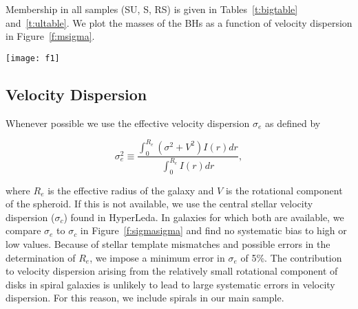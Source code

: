 \documentclass[twosided,letterpaper,numberedappendix]{emulateapj}
\newcommand{\beq}{
\begin{equation}
}
\newcommand{\eeq}{
\end{equation}
}
\newcommand{\msun}     {\ensuremath{{\rm M}_{\scriptscriptstyle \odot}}}
\newcommand{\kms}      {\ensuremath{~\mathrm{km~s^{-1}}}}
\newcommand{\msigma}   {\ensuremath{M}{--}\ensuremath{\sigma}}
\newcommand{\sigmaconf}   {\ensuremath{\sigma_{68}}}
\newcommand{\msint} {\ensuremath{8.12}}
\newcommand{\msslope} {\ensuremath{4.24}}
\begin{document}
Membership in all samples (SU, S, RS) is given in
Tables~\ref{t:bigtable} and~\ref{t:ultable}.  We plot the masses of
the BHs as a function of velocity dispersion in
Figure~\ref{f:msigma}.

\begin{figure*}[h]
\centering
\texttt{[image: f1]}
\caption{\footnotesize The \msigma\ relation for galaxies with
dynamical measurements.  The symbol indicates the method of BH mass
measurement: stellar dynamical (\emph{pentagrams}), gas dynamical
(\emph{circles)}, masers (\emph{asterisks}).  Arrows indicate
3$\sigmaconf$ upper limits to BH mass.  If the 3$\sigmaconf$ limit is
not available, we plot it at 3 times the 1$\sigmaconf$ or at 1.5 times
the 2$\sigmaconf$ limits.  For clarity, we only plot error boxes for
upper limits that are close to or below the best-fit relation.  The
color of the error ellipse indicates the Hubble type of the host
galaxy: elliptical (\emph{red}), S0 (\emph{green}), and spiral
(\emph{blue}).  The saturation of the colors in the error ellipses or
boxes is inversely proportional to the area of the ellipse or box.
Squares are galaxies that we do not include in our fit.  The line is
the best fit relation to the full sample:
$M_{\mathrm{BH}} = 10^{\msint}~\msun(\sigma/200~\kms)^{\msslope}$.
The mass uncertainty for NGC~4258 has been plotted much larger than
its actual value so that it will show on this plot.  For clarity, we
omit labels of some galaxies in crowded regions.}
\label{f:msigma}
\end{figure*}



\subsection{Velocity Dispersion}
Whenever possible we use the effective velocity dispersion $\sigma_e$
as defined by
%
\beq
\sigma^2_e \equiv \frac{\int_{0}^{R_e} \left({\sigma^2 + V^2}\right) I\left(r\right) dr}{{\int_{0}^{R_e} I\left(r\right) dr}},
\label{e:sigmae}
\eeq
%
where $R_e$ is the effective radius of the galaxy and $V$ is the
rotational component of the spheroid.  If this is not available, we
use the central stellar velocity dispersion ($\sigma_c$) found in
HyperLeda.  In galaxies for which both are available, we compare
$\sigma_e$ to $\sigma_c$ in Figure~\ref{f:sigmasigma} and find no
systematic bias to high or low values.  Because of stellar template
mismatches and possible errors in the determination of $R_e$, we
impose a minimum error in $\sigma_e$ of 5\%.  The contribution to
velocity dispersion arising from the relatively small rotational
component of disks in spiral galaxies is unlikely to lead to large
systematic errors in velocity dispersion.  For this reason, we include
spirals in our main sample.
\end{document}
